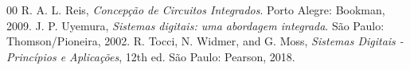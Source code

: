 \documentclass[conference]{IEEEtran}
\begin{document}
\begin{thebibliography}{00}
 R. A. L. Reis, \textit{Concepção de Circuitos Integrados}. Porto Alegre: Bookman, 2009.
 J. P. Uyemura, \textit{Sistemas digitais: uma abordagem integrada}. São Paulo: Thomson/Pioneira, 2002.
 R. Tocci, N. Widmer, and G. Moss, \textit{Sistemas Digitais - Princípios e Aplicações}, 12th ed. São Paulo: Pearson, 2018.
\end{thebibliography}
\end{document}
